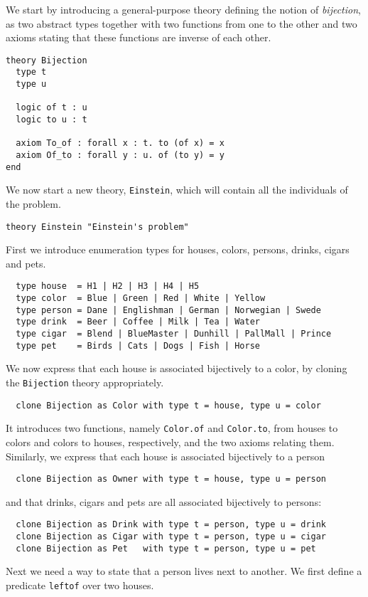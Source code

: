 We start by introducing a general-purpose theory defining the notion
of \emph{bijection}, as two abstract types together with two functions from
one to the other and two axioms stating that these functions are
inverse of each other.
\begin{verbatim}
theory Bijection
  type t
  type u

  logic of t : u
  logic to u : t

  axiom To_of : forall x : t. to (of x) = x
  axiom Of_to : forall y : u. of (to y) = y
end
\end{verbatim}

We now start a new theory, \texttt{Einstein}, which will contain all
the individuals of the problem.
\begin{verbatim}
theory Einstein "Einstein's problem"
\end{verbatim}
First we introduce enumeration types for houses, colors, persons,
drinks, cigars and pets.
\begin{verbatim}
  type house  = H1 | H2 | H3 | H4 | H5
  type color  = Blue | Green | Red | White | Yellow
  type person = Dane | Englishman | German | Norwegian | Swede
  type drink  = Beer | Coffee | Milk | Tea | Water
  type cigar  = Blend | BlueMaster | Dunhill | PallMall | Prince
  type pet    = Birds | Cats | Dogs | Fish | Horse
\end{verbatim}
We now express that each house is associated bijectively to a color,
by cloning the \texttt{Bijection} theory appropriately.
\begin{verbatim}
  clone Bijection as Color with type t = house, type u = color
\end{verbatim}
It introduces two functions, namely \texttt{Color.of} and
\texttt{Color.to}, from houses to colors and colors to houses,
respectively, and the two axioms relating them.
Similarly, we express that each house is associated bijectively to a
person
\begin{verbatim}
  clone Bijection as Owner with type t = house, type u = person
\end{verbatim}
and that drinks, cigars and pets are all associated bijectively to persons:
\begin{verbatim}
  clone Bijection as Drink with type t = person, type u = drink
  clone Bijection as Cigar with type t = person, type u = cigar
  clone Bijection as Pet   with type t = person, type u = pet
\end{verbatim}
Next we need a way to state that a person lives next to another. We
first define a predicate \texttt{leftof} over two houses.
